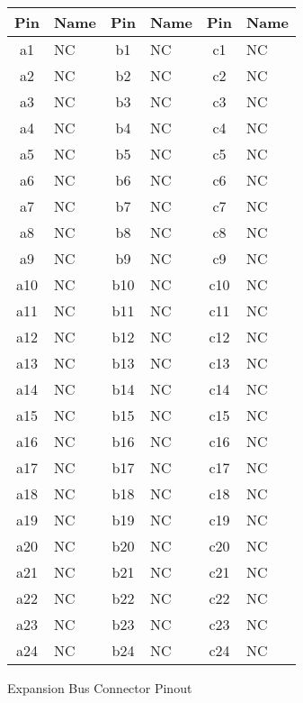 \documentclass{article}
\begin{document}
\begin{figure}[h]
	\begin{centering}

	\begin{threeparttable}
	\caption{Expansion Bus Connector Pinout}
	\begin{tabularx}{\textwidth}
		{| c | X || c | X || c | X |}
		\hline
		Pin & Name & Pin & Name & Pin & Name \\
		\hline\hline
		a1  & NC\tnote{1}	& b1  &	NC		& c1  &	NC 		\\
		\hline
		a2  & NC		& b2  &	NC		& c2  &	NC 		\\
		\hline
		a3  & NC		& b3  &	NC		& c3  &	NC 		\\
		\hline
		a4  & NC		& b4  &	NC		& c4  &	NC 		\\
		\hline
		a5  & NC		& b5  &	NC		& c5  &	NC 		\\
		\hline
		a6  & NC		& b6  &	NC		& c6  &	NC 		\\
		\hline
		a7  & NC		& b7  &	NC		& c7  &	NC 		\\
		\hline
		a8  & NC		& b8  &	NC		& c8  &	NC 		\\
		\hline
		a9  & NC		& b9  &	NC		& c9  &	NC 		\\
		\hline
		a10 & NC		& b10 &	NC		& c10 &	NC 		\\
		\hline
		a11 & NC		& b11 &	NC		& c11 &	NC 		\\
		\hline
		a12 & NC		& b12 &	NC		& c12 &	NC 		\\
		\hline
		a13 & NC		& b13 &	NC		& c13 &	NC 		\\
		\hline
		a14 & NC		& b14 &	NC		& c14 &	NC 		\\
		\hline
		a15 & NC		& b15 &	NC		& c15 &	NC 		\\
		\hline
		a16 & NC		& b16 &	NC		& c16 &	NC 		\\
		\hline
		a17 & NC		& b17 &	NC		& c17 &	NC 		\\
		\hline
		a18 & NC		& b18 &	NC		& c18 &	NC 		\\
		\hline
		a19 & NC		& b19 &	NC		& c19 &	NC 		\\
		\hline
		a20 & NC		& b20 &	NC		& c20 &	NC 		\\
		\hline
		a21 & NC		& b21 &	NC		& c21 &	NC 		\\
		\hline
		a22 & NC		& b22 &	NC		& c22 &	NC 		\\
		\hline
		a23 & NC		& b23 &	NC		& c23 &	NC 		\\
		\hline
		a24 & NC		& b24 &	NC		& c24 &	NC 		\\

\end{tabularx}
\end{threeparttable}
\end{centering}
\end{figure}
\end{document}
